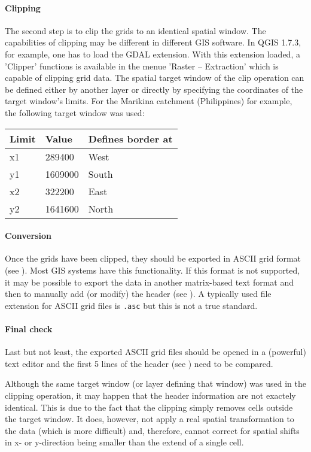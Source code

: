 \paragraph{Clipping}
The second step is to clip the grids to an identical spatial window. The capabilities of clipping may be different in different GIS software. In QGIS 1.7.3, for example, one has to load the GDAL extension. With this extension loaded, a 'Clipper' functions is available in the menue 'Raster -- Extraction' which is capable of clipping grid data. The spatial target window of the clip operation can be defined either by another layer or directly by specifying the coordinates of the target window's limits. For the Marikina catchment (Philippines) for example, the following target window was used:

\begin{tabular}{lll} \hline\hline
  Limit   & Value & Defines border at \\
  \hline
  x1 & 289400 & West \\
  y1 & 1609000 & South \\
  x2 & 322200 & East \\
  y2 & 1641600 & North \\
  \hline
\end{tabular}

\paragraph{Conversion}
Once the grids have been clipped, they should be exported in ASCII grid format (see ). Most GIS systems have this functionality. If this format is not supported, it may be possible to export the data in another matrix-based text format and then to manually add (or modify) the header (see ). A typically used file extension for ASCII grid files is \texttt{.asc} but this is not a true standard.

\paragraph{Final check}
Last but not least, the exported ASCII grid files should be opened in a (powerful) text editor and the first 5 lines of the header (see ) need to be compared.

Although the same target window (or layer defining that window) was used in the clipping operation, it may happen that the header information are not exactely identical. This is due to the fact that the clipping simply removes cells outside the target window. It does, however, not apply a real spatial transformation to the data (which is more difficult) and, therefore, cannot correct for spatial shifts in x- or y-direction being smaller than the extend of a single cell.

